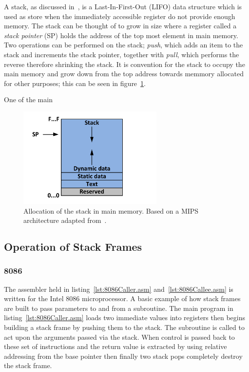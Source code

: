 \documentclass[12pt,a4paper]{article}
\begin{document}



A stack, as discussed in~\cite{stack}, is a Last-In-First-Out (LIFO) data structure which is used as store when the immediately accessible register do not provide enough memory.
The stack can be thought of to grow in size where a register called a \emph{stack pointer} (SP) holds the address of the top most element in main memory.
Two operations can be performed on the stack; \emph{push}, which adds an item to the stack and increments the stack pointer, together with \emph{pull}, which performs the reverse therefore shrinking the stack. 
It is convention for the stack to occupy the main memory and grow down from the top address towards memmory allocated for other purposes; this can be seen in figure~\ref{fig:allocation}.

One of the main

\begin{figure}[htb]
   \centering
   \includegraphics[height=5cm]{Figures/allocation.pdf}
   \caption{Allocation of the stack in main memory. Based on a MIPS architecture adapted from~\cite{stack}.}
   \label{fig:allocation}
\end{figure}






\subsection{Operation of Stack Frames}

\subsubsection{8086}
\label{8086}
The assembler held in listing~\ref{lst:8086Caller.asm} and~\ref{lst:8086Callee.asm} is written for the Intel 8086 microprocessor.
A basic example of how stack frames are built to pass parameters to and from a subroutine.
The main program in listing~\ref{lst:8086Caller.asm} loads two immediate values into registers then begins building a stack frame by pushing them to the stack.  
The subroutine is called to act upon the arguments passed via the stack.
When control is passed back to these set of instructions and the return value is extracted by using relative addressing from the base pointer then finally two stack pops completely destroy the stack frame.
\end{document}

